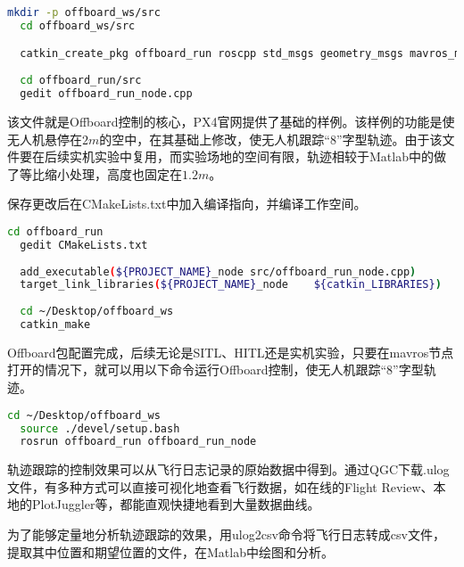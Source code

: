 \begin{lstlisting}[language=Bash, basicstyle=\footnotesize, linewidth=\linewidth, breaklines=true]
  mkdir -p offboard_ws/src
  cd offboard_ws/src

  catkin_create_pkg offboard_run roscpp std_msgs geometry_msgs mavros_msgs
  
  cd offboard_run/src
  gedit offboard_run_node.cpp
\end{lstlisting}

该文件就是Offboard控制的核心，PX4官网提供了基础的样例\cite{Offboard}。该样例的功能是使无人机悬停在$2m$的空中，在其基础上修改，使无人机跟踪“8”字型轨迹。由于该文件要在后续实机实验中复用，而实验场地的空间有限，轨迹相较于Matlab中的做了等比缩小处理，高度也固定在$1.2m$。

保存更改后在CMakeLists.txt中加入编译指向，并编译工作空间。

\begin{lstlisting}[language=Bash, basicstyle=\footnotesize, linewidth=\linewidth, breaklines=true]
  cd offboard_run
  gedit CMakeLists.txt
  
  add_executable(${PROJECT_NAME}_node src/offboard_run_node.cpp)
  target_link_libraries(${PROJECT_NAME}_node    ${catkin_LIBRARIES})
  
  cd ~/Desktop/offboard_ws
  catkin_make
\end{lstlisting}
  
Offboard包配置完成，后续无论是SITL、HITL还是实机实验，只要在mavros节点打开的情况下，就可以用以下命令运行Offboard控制，使无人机跟踪“8”字型轨迹。

\begin{lstlisting}[language=Bash, basicstyle=\footnotesize, linewidth=\linewidth, breaklines=true]
  cd ~/Desktop/offboard_ws
  source ./devel/setup.bash
  rosrun offboard_run offboard_run_node
\end{lstlisting}

轨迹跟踪的控制效果可以从飞行日志记录的原始数据中得到。通过QGC下载.ulog文件，有多种方式可以直接可视化地查看飞行数据，如在线的Flight Review、本地的PlotJuggler等，都能直观快捷地看到大量数据曲线。

为了能够定量地分析轨迹跟踪的效果，用ulog2csv命令将飞行日志转成csv文件，提取其中位置和期望位置的文件，在Matlab中绘图和分析。

